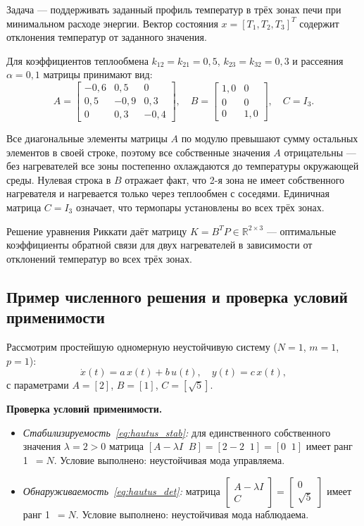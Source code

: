 \documentclass[12pt, a4paper, oneside]{extarticle}
\begin{document}
Задача --- поддерживать заданный профиль температур в трёх зонах печи при
минимальном расходе энергии. Вектор состояния $x = [T_1, T_2, T_3]^T$ содержит
отклонения температур от заданного значения.

Для коэффициентов теплообмена $k_{12} = k_{21} = 0{,}5$,
$k_{23} = k_{32} = 0{,}3$ и рассеяния $\alpha = 0{,}1$ матрицы принимают вид:
\[
A =
\begin{bmatrix}
-0{,}6 &  0{,}5 & 0      \\
 0{,}5 & -0{,}9 & 0{,}3  \\
 0     &  0{,}3 & -0{,}4
\end{bmatrix},\quad
B =
\begin{bmatrix} 1{,}0 & 0 \\ 0 & 0 \\ 0 & 1{,}0 \end{bmatrix},\quad
C = I_3.
\]

Все диагональные элементы матрицы $A$ по модулю превышают сумму остальных
элементов в своей строке, поэтому все собственные значения $A$ отрицательны ---
без нагревателей все зоны постепенно охлаждаются до температуры окружающей
среды. Нулевая строка в $B$ отражает факт, что 2-я зона не имеет собственного
нагревателя и нагревается только через теплообмен с соседями. Единичная матрица
$C = I_3$ означает, что термопары установлены во всех трёх зонах.

Решение уравнения Риккати даёт матрицу $K = B^T P \in \mathbb{R}^{2 \times 3}$
--- оптимальные коэффициенты обратной связи для двух нагревателей в зависимости
от отклонений температур во всех трёх зонах.

\subsection{Пример численного решения и проверка условий применимости}

Рассмотрим простейшую одномерную неустойчивую систему ($N = 1$, $m = 1$,
$p = 1$):
\begin{equation*}
    \dot{x}(t) = a\,x(t) + b\,u(t),\quad y(t) = c\,x(t),
\end{equation*}
с параметрами $A = [2]$, $B = [1]$, $C = [\sqrt{5}]$.

\textbf{Проверка условий применимости.}
\begin{itemize}
    \item \textit{Стабилизируемость~\eqref{eq:hautus_stab}:} для единственного
    собственного значения $\lambda = 2 > 0$ матрица
    $[A - \lambda I\;\;B] = [2 - 2\;\;1] = [0\;\;1]$ имеет ранг 1~$= N$.
    Условие выполнено: неустойчивая мода управляема.

    \item \textit{Обнаруживаемость~\eqref{eq:hautus_det}:} матрица
    $\begin{bmatrix}A - \lambda I\\ C\end{bmatrix}
    = \begin{bmatrix}0\\ \sqrt{5}\end{bmatrix}$ имеет ранг 1~$= N$.
    Условие выполнено: неустойчивая мода наблюдаема.
\end{itemize}
\end{document}
